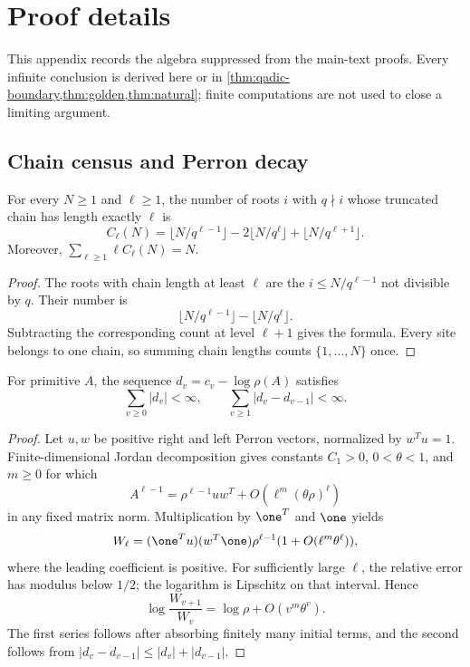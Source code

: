\section{Proof details}
\label{app:proofs}

This appendix records the algebra suppressed from the main-text proofs.
Every infinite conclusion is derived here or in
\cref{thm:qadic-boundary,thm:golden,thm:natural}; finite computations are not
used to close a limiting argument.

\subsection{Chain census and Perron decay}

\begin{lemma}
\label{lem:histogram}
For every \(N\ge1\) and \(\ell\ge1\), the number of roots \(i\) with
\(q\nmid i\) whose truncated chain has length exactly \(\ell\) is
\[
  C_\ell(N)=
  \lfloor N/q^{\ell-1}\rfloor
  -2\lfloor N/q^\ell\rfloor
  +\lfloor N/q^{\ell+1}\rfloor .
\]
Moreover, \(\sum_{\ell\ge1}\ell C_\ell(N)=N\).
\end{lemma}

\begin{proof}
The roots with chain length at least \(\ell\) are the \(i\le
N/q^{\ell-1}\) not divisible by \(q\).  Their number is
\[
  \lfloor N/q^{\ell-1}\rfloor-\lfloor N/q^\ell\rfloor.
\]
Subtracting the corresponding count at level \(\ell+1\) gives the formula.
Every site belongs to one chain, so summing chain lengths counts
\(\{1,\ldots,N\}\) once.
\end{proof}

\begin{lemma}
\label{lem:perron}
For primitive \(A\), the sequence \(d_v=c_v-\log\rho(A)\) satisfies
\[
  \sum_{v\ge0}|d_v|<\infty,\qquad
  \sum_{v\ge1}|d_v-d_{v-1}|<\infty.
\]
\end{lemma}

\begin{proof}
Let \(u,w\) be positive right and left Perron vectors, normalized by
\(w^Tu=1\).  Finite-dimensional Jordan decomposition gives constants
\(C_1>0\), \(0<\theta<1\), and \(m\ge0\) for which
\[
  A^{\ell-1}=\rho^{\ell-1}uw^T+
  O(\ell^m(\theta\rho)^\ell)
\]
in any fixed matrix norm.  Multiplication by \(\one^T\) and \(\one\) yields
\[
  W_\ell=(\one^Tu)(w^T\one)\rho^{\ell-1}
  (1+O(\ell^m\theta^\ell)),
\]
where the leading coefficient is positive.  For sufficiently large
\(\ell\), the relative error has modulus below \(1/2\); the logarithm is
Lipschitz on that interval.  Hence
\[
  \log\frac{W_{v+1}}{W_v}=\log\rho+O(v^m\theta^v).
\]
The first series follows after absorbing finitely many initial terms, and
the second follows from
\(|d_v-d_{v-1}|\le|d_v|+|d_{v-1}|\).
\end{proof}

